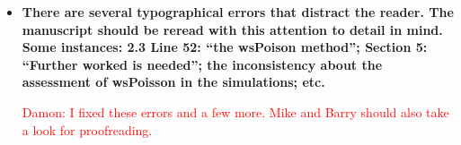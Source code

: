 \documentclass[11pt]{article}
\begin{document}
\begin{itemize}
\begin{itemize}
        \item \textbf{There are several typographical errors that distract the reader. The manuscript should be reread with this attention to detail in mind. Some instances: 2.3 Line 52: “the wsPoison method”; Section 5: “Further worked is needed”; the inconsistency about the assessment of wsPoisson in the simulations; etc.}
        
        \textcolor{red}{Damon: I fixed these errors and a few more. Mike and Barry should also take a look for proofreading.}

    \end{itemize}
\end{itemize}
\end{document}
